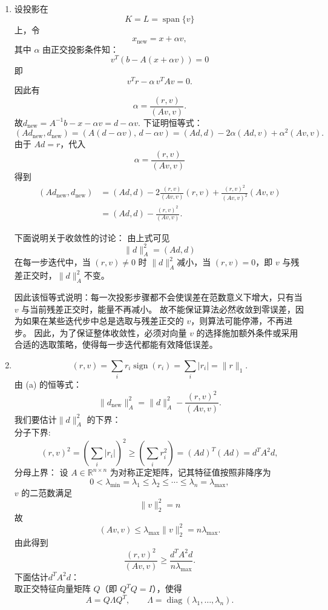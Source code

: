 \documentclass{ctexart}
\newcommand{\norm}[1]{\lVert#1\rVert}
\begin{document}
\begin{solution}
  \begin{enumerate}
\item 设投影在
\[
K = L = \operatorname{span}\{v\}
\]
上，令
\[
x_{\text{new}} = x + \alpha v,
\]
其中 \(\alpha\) 由正交投影条件知：
\[
v^{T}(b - A(x + \alpha v)) = 0
\]
即\[
v^{T}r - \alpha\, v^{T}Av = 0.
\]
因此有
\[
\alpha = \frac{(r, v)}{(Av, v)}.
\]
故\(d_{\text{new}}=A^{-1} b -x - \alpha v=d-\alpha v \).
下证明恒等式：
\[
(Ad_{\text{new}}, d_{\text{new}})
= (A(d - \alpha v),\, d - \alpha v)
= (Ad, d) - 2\alpha(Ad, v) + \alpha^2 (Av, v).
\]
由于 \(Ad = r\)，代入
\[
\alpha = \frac{(r, v)}{(Av, v)}
\]
得到
\[
\begin{aligned}
(Ad_{\text{new}}, d_{\text{new}})
&= (Ad, d) - 2 \frac{(r, v)}{(Av, v)} (r, v) + \frac{(r, v)^2}{(Av, v)^2} (Av, v) \\[6pt]
&= (Ad, d) - \frac{(r, v)^2}{(Av, v)}.
\end{aligned}
\]

下面说明关于收敛性的讨论：
由上式可见
\[
\norm{d} _A^2 = (Ad, d)
\]
在每一步迭代中，当 \((r, v) \neq 0\) 时 \(\norm{d}_{A}^2  \)减小，当 \((r, v) = 0\)，即 \(v\) 与残差正交时，\(\norm{d}_A^2 \)不变。

因此该恒等式说明：每一次投影步骤都不会使误差在范数意义下增大，只有当 \(v\) 与当前残差正交时，能量不再减小。
故不能保证算法必然收敛到零误差，因为如果在某些迭代步中总是选取与残差正交的 \(v\)，则算法可能停滞，不再进步。
因此，为了保证整体收敛性，必须对向量 \(v\) 的选择施加额外条件或采用合适的选取策略，使得每一步迭代都能有效降低误差。
\item 
\[
(r,v) = \sum_i r_i \operatorname{sign}(r_i)
= \sum_i |r_i|
= \lVert r \rVert_1.
\]
由 (a) 的恒等式：
\[
\lVert d_{\mathrm{new}} \rVert_A^2 
= \lVert d \rVert_A^2 
- \frac{(r,v)^2}{(A v, v)}.
\]
我们要估计\(\norm{d}_A^2 \) 的下界：\\
分子下界:
\[
(r,v)^2 
= (\sum_i |r_i|)^2 \geq (\sum_{i} r_i^2)
= (A d)^T (A d) = d^T A^2 d,
\]
分母上界：
设 \(A\in\mathbb R^{n\times n}\) 为对称正定矩阵，记其特征值按照非降序为
\[
0<\lambda_{\min}=\lambda_1\le \lambda_2\le\cdots\le\lambda_n=\lambda_{\max},
\]
$v$ 的二范数满足
\[
\lVert v \rVert_2^2 = n
\]
故
\[
(A v, v) \le \lambda_{\max}\lVert v \rVert_2^2 = n\lambda_{\max}.
\]
由此得到
\[
\frac{(r,v)^2}{(A v,v)} 
\ge \frac{d^T A^2 d}{n \lambda_{\max}}.
\]
下面估计\(d^TA^2d \)：\\
取正交特征向量矩阵 \(Q\)（即 \(Q^TQ=I\)），使得
\[
A = Q\Lambda Q^T,\qquad \Lambda=\operatorname{diag}(\lambda_1,\dots,\lambda_n).
\]


\end{enumerate}
\end{solution}
\end{document}
